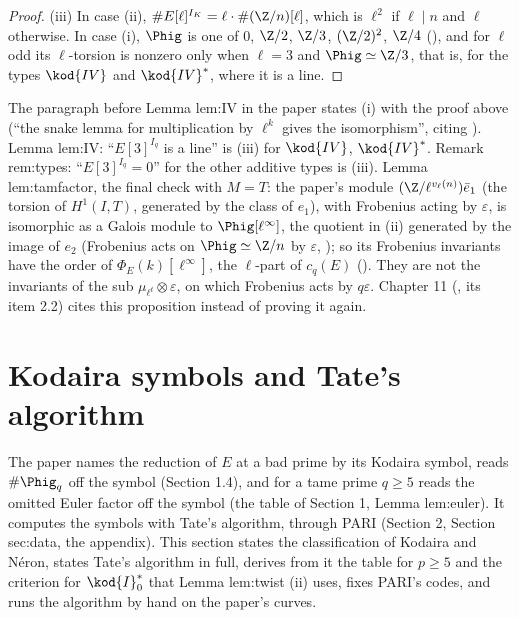 \begin{proof}
(iii) In case (ii), $\#E[\ell]^{I_K}=\ell\cdot\#(\Z/n)[\ell]$, which is $\ell^2$ if $\ell\mid n$ and $\ell$ otherwise. In case
(i), $\Phig$ is one of $0$, $\Z/2$, $\Z/3$, $(\Z/2)^2$, $\Z/4$ (), and for $\ell$ odd its
$\ell$-torsion is nonzero only when $\ell=3$ and $\Phig\simeq\Z/3$, that is, for the types $\kod{IV}$ and $\kod{IV}^*$, where
it is a line.
\end{proof}

\begin{paperlink}
The paragraph before Lemma lem:IV in the paper states (i) with the proof above (``the snake lemma for
multiplication by $\ell^k$ gives the isomorphism'', citing \cite[Section 1]{SerreTate68}). Lemma lem:IV: ``$E[3]^{I_q}$
is a line'' is (iii) for $\kod{IV}$, $\kod{IV}^*$. Remark rem:types: ``$E[3]^{I_q}=0$'' for the other additive types is
(iii). Lemma lem:tamfactor, the final check with $M=T$: the paper's module $(\Z/\ell^{v_\ell(n)})\bar e_1$ (the torsion of
$H^1(I,T)$, generated by the class of $e_1$), with Frobenius acting by $\varepsilon$, is isomorphic as a Galois module to
$\Phig[\ell^\infty]$, the quotient in (ii) generated by the image of $e_2$ (Frobenius acts on $\Phig\simeq\Z/n$ by $\varepsilon$,
); so its Frobenius invariants have the order of $\Phi_E(k)[\ell^\infty]$, the $\ell$-part of
$c_q(E)$ (). They are not the invariants of the sub $\mu_{\ell^t}\otimes\varepsilon$, on which
Frobenius acts by $q\varepsilon$. Chapter 11 (, its item 2.2) cites this proposition instead of
proving it again.
\end{paperlink}

\section{Kodaira symbols and Tate's algorithm}\label{sec:reduction:kodaira}

The paper names the reduction of $E$ at a bad prime by its Kodaira symbol, reads $\#\Phig_q$ off the symbol
(Section 1.4), and for a tame prime $q\ge5$ reads the omitted Euler factor off the symbol (the table of Section 1,
Lemma lem:euler). It computes the symbols with Tate's algorithm, through PARI (Section 2, Section sec:data, the
appendix). This section states the classification of Kodaira and N\'eron, states Tate's algorithm in full, derives
from it the table for $p\ge5$ and the criterion for $\kod{I}_0^*$ that Lemma lem:twist (ii) uses, fixes PARI's codes,
and runs the algorithm by hand on the paper's curves.

